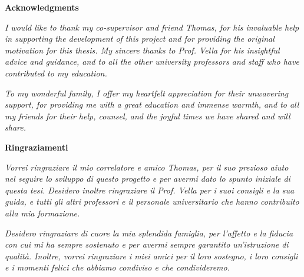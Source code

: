 \thispagestyle{empty}

\begin{center}
  {\bf \LARGE Acknowledgments}
\end{center}

\vspace{2mm}
\emph{
I would like to thank my co-supervisor and friend Thomas, for his invaluable help in supporting the development of this project and for providing the original motivation for this thesis. My sincere thanks to Prof. Vella for his insightful advice and guidance, and to all the other university professors and staff who have contributed to my education.
}
\par
\emph{
To my wonderful family, I offer my heartfelt appreciation for their unwavering support, for providing me with a great education and immense warmth, and to all my friends for their help, counsel, and the joyful times we have shared and will share.
}

\vspace{1cm}

\begin{center}
    {\bf \LARGE Ringraziamenti}
\end{center}

\vspace{2mm}

\emph{
Vorrei ringraziare il mio correlatore e amico Thomas, per il suo prezioso aiuto nel seguire lo sviluppo di questo progetto e per avermi dato lo spunto iniziale di questa tesi. Desidero inoltre ringraziare il Prof. Vella per i suoi consigli e la sua guida, e tutti gli altri professori e il personale universitario che hanno contribuito alla mia formazione.
}
\par
\emph{
Desidero ringraziare di cuore la mia splendida famiglia, per l’affetto e la fiducia con cui mi ha sempre sostenuto e per avermi sempre garantito un’istruzione di qualità. Inoltre, vorrei ringraziare i miei amici per il loro sostegno, i loro consigli e i momenti felici che abbiamo condiviso e che condivideremo.
}